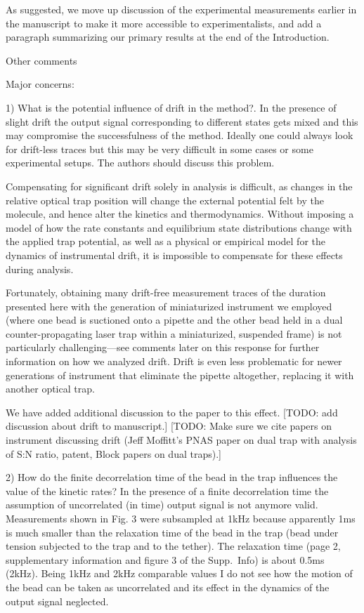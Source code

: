 \documentclass[ucb,qb3,10pt,fullfrom]{ucletter}
\begin{document}
\begin{letter}{}
As suggested, we move up discussion of the experimental measurements earlier in the manuscript to make it more accessible to experimentalists, and add a paragraph summarizing our primary results at the end of the Introduction. 

\color{red}
Other comments

Major concerns:

1) What is the potential influence of drift in the method?. In the presence of slight drift the output signal corresponding to different states gets mixed and this may compromise the successfulness of the method. Ideally one could always look for drift-less traces but this may be very difficult in some cases or some experimental setups. The authors should discuss this problem.
\color{black}

Compensating for significant drift solely in analysis is difficult, as changes in the relative optical trap position will change the external potential felt by the molecule, and hence alter the kinetics and thermodynamics.
Without imposing a model of how the rate constants and equilibrium state distributions change with the applied trap potential, as well as a physical or empirical model for the dynamics of instrumental drift, it is impossible to compensate for these effects during analysis.

Fortunately, obtaining many drift-free measurement traces of the duration presented here with the generation of miniaturized instrument we employed (where one bead is suctioned onto a pipette and the other bead held in a dual counter-propagating laser trap within a miniaturized, suspended frame) is not particularly challenging---see comments later on this response for further information on how we analyzed drift.
Drift is even less problematic for newer generations of instrument that eliminate the pipette altogether, replacing it with another optical trap.

We have added additional discussion to the paper to this effect. 
{\color{blue} [TODO: add discussion about drift to manuscript.]}
{\color{blue} [TODO: Make sure we cite papers on instrument discussing drift (Jeff Moffitt's PNAS paper on dual trap with analysis of S:N ratio, patent, Block papers on dual traps).]}

\color{red}
2) How do the finite decorrelation time of the bead in the trap influences the value of the kinetic rates? In the presence of a finite decorrelation time the assumption of uncorrelated (in time) output signal is not anymore valid. Measurements shown in Fig. 3 were subsampled at 1kHz because apparently 1ms is much smaller than the relaxation time of the bead in the trap (bead under tension subjected to the trap and to the tether). The relaxation time (page 2, supplementary information and figure 3 of the Supp.~Info) is about 0.5ms (2kHz). Being 1kHz and 2kHz comparable values I do not see how the motion of the bead can be taken as uncorrelated and its effect in the dynamics of the output signal neglected.
\color{black}


\end{letter}
\end{document}
